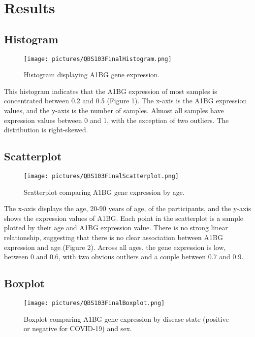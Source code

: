 \documentclass{article}
\begin{document}
\section{Results}
\subsection{Histogram}
\begin{figure}[H]
    \centering
    \texttt{[image: pictures/QBS103FinalHistogram.png]}
    \caption{Histogram displaying A1BG gene expression.}
    \label{fig:placeholder}
\end{figure}

This histogram indicates that the A1BG expression of most samples is concentrated between 0.2 and 0.5 (Figure 1). The x-axis is the A1BG expression values, and the y-axis is the number of samples. Almost all samples have expression values between 0 and 1, with the exception of two outliers. The distribution is right-skewed. 



\subsection{Scatterplot}
\begin{figure}[H]
    \centering
    \texttt{[image: pictures/QBS103FinalScatterplot.png]}
    \caption{Scatterplot comparing A1BG gene expression by age.}
    \label{fig:placeholder}
\end{figure}

The x-axis displays the age, 20-90 years of age, of the participants, and the y-axis shows the expression values of A1BG. Each point in the scatterplot is a sample plotted by their age and A1BG expression value. There is no strong linear relationship, suggesting that there is no clear association between A1BG expression and age (Figure 2). Across all ages, the gene expression is low, between 0 and 0.6, with two obvious outliers and a couple between 0.7 and 0.9.



\subsection{Boxplot}
\begin{figure}[H]
    \centering
    \texttt{[image: pictures/QBS103FinalBoxplot.png]}
    \caption{Boxplot comparing A1BG gene expression by disease state (positive or negative for COVID-19) and sex.}
    \label{fig:placeholder}
\end{figure}
\end{document}
